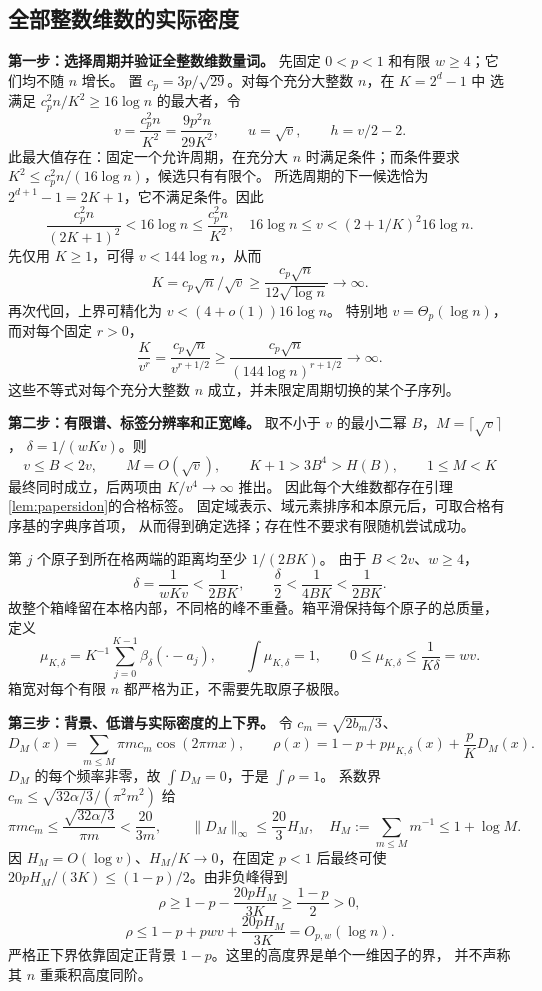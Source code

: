 \documentclass[UTF8,a4paper,11pt,fontset=fandol]{ctexart}
\theoremstyle{remark}
\begin{document}
\subsection{全部整数维数的实际密度}
\textbf{第一步：选择周期并验证全整数维数量词。}
先固定 $0<p<1$ 和有限 $w\ge4$；它们均不随 $n$ 增长。
置 $c_p=3p/\sqrt{29}$。对每个充分大整数 $n$，在 $K=2^d-1$ 中
选满足 $c_p^2n/K^2\ge16\log n$ 的最大者，令
\[
 v=\frac{c_p^2n}{K^2}=\frac{9p^2n}{29K^2},
 \qquad u=\sqrt v,\qquad h=v/2-2.
\]
此最大值存在：固定一个允许周期，在充分大 $n$ 时满足条件；而条件要求
$K^2\le c_p^2n/(16\log n)$，候选只有有限个。
所选周期的下一候选恰为 $2^{d+1}-1=2K+1$，它不满足条件。因此
\[
 \frac{c_p^2n}{(2K+1)^2}<16\log n\le\frac{c_p^2n}{K^2},
 \quad 16\log n\le v<(2+1/K)^2 16\log n.
\]
先仅用 $K\ge1$，可得 $v<144\log n$，从而
\[
 K=c_p\sqrt n/\sqrt v\ge\frac{c_p\sqrt n}{12\sqrt{\log n}}\to\infty.
\]
再次代回，上界可精化为 $v<(4+o(1))16\log n$。
特别地 $v=\Theta_p(\log n)$，而对每个固定 $r>0$，
\[
 \frac K{v^r}=\frac{c_p\sqrt n}{v^{r+1/2}}
 \ge\frac{c_p\sqrt n}{(144\log n)^{r+1/2}}\to\infty.
\]
这些不等式对每个充分大整数 $n$ 成立，并未限定周期切换的某个子序列。

\textbf{第二步：有限谱、标签分辨率和正宽峰。}
取不小于 $v$ 的最小二幂 $B$，$M=\lceil\sqrt v\rceil$，
$\delta=1/(wKv)$。则
\[
 v\le B<2v,\qquad M=O(\sqrt v),\qquad
 K+1>3B^4>H(B),\qquad1\le M<K
\]
最终同时成立，后两项由 $K/v^4\to\infty$ 推出。
因此每个大维数都存在引理\ref{lem:papersidon}的合格标签。
固定域表示、域元素排序和本原元后，可取合格有序基的字典序首项，
从而得到确定选择；存在性不要求有限随机尝试成功。

第 $j$ 个原子到所在格两端的距离均至少 $1/(2BK)$。
由于 $B<2v$、$w\ge4$，
\[
 \delta=\frac1{wKv}<\frac1{2BK},\qquad
 \frac\delta2<\frac1{4BK}<\frac1{2BK}.
\]
故整个箱峰留在本格内部，不同格的峰不重叠。箱平滑保持每个原子的总质量，
定义
\[
 \mu_{K,\delta}=K^{-1}\sum_{j=0}^{K-1}\beta_\delta(\cdot-a_j),
 \qquad \int\mu_{K,\delta}=1,
 \qquad0\le\mu_{K,\delta}\le\frac1{K\delta}=wv.
\]
箱宽对每个有限 $n$ 都严格为正，不需要先取原子极限。

\textbf{第三步：背景、低谱与实际密度的上下界。}
令 $c_m=\sqrt{2b_m/3}$、
\[
 D_M(x)=\sum_{m\le M}\pi m c_m\cos(2\pi mx),
 \qquad\rho(x)=1-p+p\mu_{K,\delta}(x)+\frac pK D_M(x).
\]
$D_M$ 的每个频率非零，故 $\int D_M=0$，于是 $\int\rho=1$。
系数界 $c_m\le\sqrt{32\alpha/3}/(\pi^2m^2)$ 给
\[
 \pi m c_m\le\frac{\sqrt{32\alpha/3}}{\pi m}<\frac{20}{3m},
 \qquad\|D_M\|_\infty\le\frac{20}3H_M,
 \quad H_M:=\sum_{m\le M}m^{-1}\le1+\log M.
\]
因 $H_M=O(\log v)$、$H_M/K\to0$，在固定 $p<1$ 后最终可使
$20pH_M/(3K)\le(1-p)/2$。由非负峰得到
\[
 \rho\ge1-p-\frac{20pH_M}{3K}\ge\frac{1-p}{2}>0,
\]
\[
 \rho\le1-p+pwv+\frac{20pH_M}{3K}=O_{p,w}(\log n).
\]
严格正下界依靠固定正背景 $1-p$。这里的高度界是单个一维因子的界，
并不声称其 $n$ 重乘积高度同阶。
\end{document}
